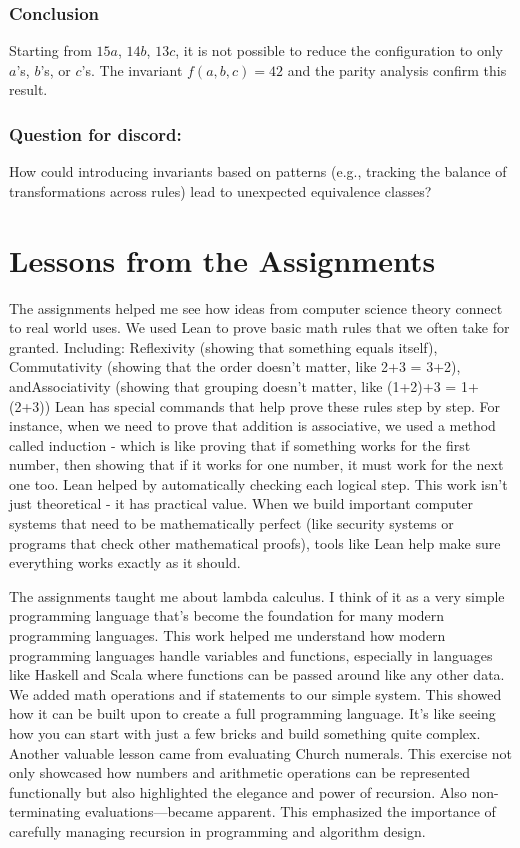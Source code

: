 \documentclass{article}
\theoremstyle{theorem}
\theoremstyle{definition}
\theoremstyle{remark}
\begin{document}
\subsubsection*{Conclusion}
Starting from \( 15a \), \( 14b \), \( 13c \), it is not possible to reduce the configuration to only \( a \)'s, \( b \)'s, or \( c \)'s. The invariant \( f(a, b, c) = 42 \) and the parity analysis confirm this result.




\subsubsection*{Question for discord:}
How could introducing invariants based on patterns (e.g., tracking the balance of transformations across rules) lead to unexpected equivalence classes?
  

\section{Lessons from the Assignments}

The assignments helped me see how ideas from computer science theory connect to real world uses. 
We used Lean to prove basic math rules that we often take for granted. Including: Reflexivity
(showing that something equals itself), Commutativity (showing that the order doesn't matter, 
like 2+3 = 3+2), andAssociativity (showing that grouping doesn't matter, like (1+2)+3 = 1+(2+3))
Lean has special commands that help prove these rules step by step. For instance, when we need 
to prove that addition is associative, we used a method called induction - which is like proving 
that if something works for the first number, then showing that if it works for one number, it 
must work for the next one too. Lean helped by automatically checking each logical step. This 
work isn't just theoretical - it has practical value. When we build important computer systems 
that need to be mathematically perfect (like security systems or programs that check other 
mathematical proofs), tools like Lean help make sure everything works exactly as it should.

The assignments taught me about lambda calculus. I think of it as a very simple programming language 
that's become the foundation for many modern programming languages. This work helped me understand 
how modern programming languages handle variables and functions, especially in languages like Haskell 
and Scala where functions can be passed around like any other data. We added math operations and if 
statements to our simple system. This showed how it can be built upon to create a full programming 
language. It's like seeing how you can start with just a few bricks and build something quite complex. 
Another valuable lesson came from evaluating Church numerals. This exercise not only showcased how 
numbers and arithmetic operations can be represented functionally but also highlighted the elegance 
and power of recursion. Also non-terminating evaluations—became apparent. This emphasized the 
importance of carefully managing recursion in programming and algorithm design.
\end{document}
